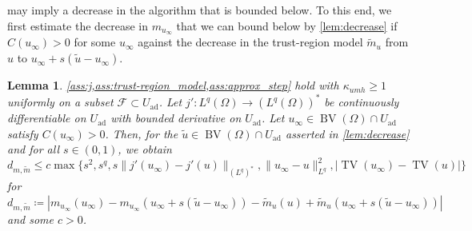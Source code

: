 \documentclass[11pt]{article}
\newcommand{\calF}{\mathcal{F}}
\DeclareMathOperator*{\BV}{BV}
\DeclareMathOperator*{\TV}{TV}
\newcommand{\feas}{U_{\textrm{ad}}}
\newtheorem{lemma}[theorem]{Lemma}
\theoremstyle{definition}
\theoremstyle{remark}
\begin{document}
may imply a decrease in the algorithm that is bounded
below. To this end, we first estimate the decrease
in $m_{u_\infty}$ that we can bound below by 
\cref{lem:decrease}
if $C(u_\infty) > 0$ for some $u_\infty$
against the decrease in the trust-region model
$\tilde{m}_u$
from $u$ to $u_\infty + s(\tilde{u} - u_\infty)$.
%
\begin{lemma}\label{lem:mq_mtildeu_approx}
\cref{ass:j,ass:trust-region_model,ass:approx_step} hold with $\kappa_{umh} \ge 1$ uniformly on a subset $\calF \subset \feas$.
Let $j' : L^q(\Omega) \to (L^q(\Omega))^*$ be
continuously differentiable on $\feas$ with
bounded derivative on $\feas$.
Let $u_\infty \in \BV(\Omega) \cap \feas$
satisfy $C(u_\infty) > 0$.
Then, for the $\tilde{u} \in \BV(\Omega) \cap \feas$
asserted in \cref{lem:decrease} and for all $s \in (0,1)$, we obtain
%
\[ d_{m,\tilde{m}}
   \le c\max\{
   s^2,
   s^q,
   s\|j'(u_\infty) - j'(u)\|_{(L^q)^*},
   \|u_\infty - u\|_{L^q}^2,
   |\TV(u_\infty) - \TV(u)|
   \}
\]
%
for $d_{m,\tilde{m}} \coloneqq 
|m_{u_\infty}(u_\infty) - m_{u_\infty}(u_\infty + s(\tilde{u} - u_\infty))
- \tilde{m}_u(u) + \tilde{m}_u(u_\infty + s(\tilde{u} - u_\infty))|$ and some $c > 0$.
\end{lemma}
\end{document}
